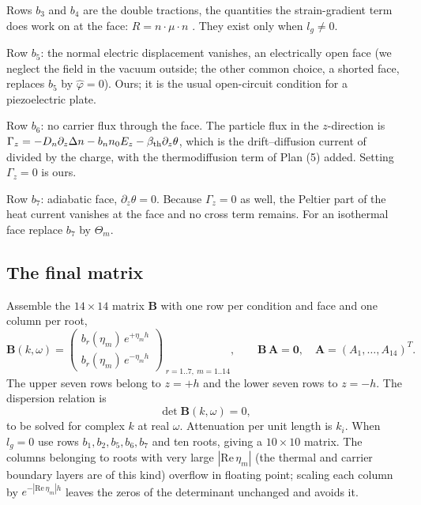 \documentclass[11pt]{article}
\begin{document}
Rows $b_3$ and $b_4$ are the double tractions, the quantities the strain-gradient term does work on at the
face: $R=n\cdot\mu\cdot n$ \cite[Sec.~2, condition b(i)]{Charal2019}. They exist only when $l_g\ne0$.

Row $b_5$: the normal electric displacement vanishes, an electrically open face (we neglect the field in the
vacuum outside; the other common choice, a shorted face, replaces $b_5$ by $\hat\varphi=0$). Ours; it is the
usual open-circuit condition for a piezoelectric plate.

Row $b_6$: no carrier flux through the face. The particle flux in the $z$-direction is
$\Gamma_z=-D_n\partial_z\Delta n-b_nn_0E_z-\beta_{\rm th}\partial_z\theta$, which is the drift--diffusion current of
\cite[Eq.\ (3), Eq.\ (7)]{Zhu2023} divided by the charge, with the thermodiffusion term of Plan (5) added.
Setting $\Gamma_z=0$ is ours.

Row $b_7$: adiabatic face, $\partial_z\theta=0$. Because $\Gamma_z=0$ as well, the Peltier part of the heat
current vanishes at the face and no cross term remains. For an isothermal face replace $b_7$ by $\Theta_m$.

\subsection{The final matrix}

Assemble the $14\times14$ matrix $\mathbf B$ with one row per condition and face and one column per root,
\begin{equation}
\mathbf B(k,\omega)=
\begin{pmatrix}
b_r(\eta_m)\,e^{+\eta_mh}\\[2pt]
b_r(\eta_m)\,e^{-\eta_mh}
\end{pmatrix}_{\;r=1..7,\ m=1..14},
\qquad \mathbf B\,\mathbf A=\mathbf 0 ,\quad \mathbf A=(A_1,\dots,A_{14})^T .
\label{eq:Bmatrix}
\end{equation}
The upper seven rows belong to $z=+h$ and the lower seven rows to $z=-h$. The dispersion relation is
\begin{equation}
\det\mathbf B(k,\omega)=0 ,
\label{eq:disp}
\end{equation}
to be solved for complex $k$ at real $\omega$. Attenuation per unit length is $k_i$. When $l_g=0$ use rows
$b_1,b_2,b_5,b_6,b_7$ and ten roots, giving a $10\times10$ matrix. The columns belonging to roots with
very large $|\mathrm{Re}\,\eta_m|$ (the thermal and carrier boundary layers are of this kind) overflow in
floating point; scaling each column by $e^{-|\mathrm{Re}\,\eta_m|h}$ leaves the zeros of the determinant
unchanged and avoids it.
\end{document}
